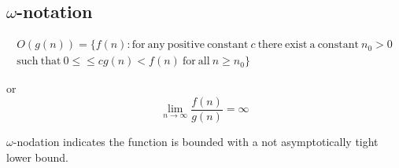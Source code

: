 \subsection{$\omega$-notation}


\begin{gather*}
  O(g(n)) = \{ f(n): \mathrm{for\ any\ positive\ constant\ } c\ \mathrm{there\ exist\ a\ constant\ } n_0 > 0 \\
  \mathrm{such\ that\ } 0 \le \le c g(n) < f(n) \mathrm{\ for\ all\ } n\ge n_0 \}
\end{gather*}

or
\begin{equation*}
  \lim_{n\rightarrow\infty}\frac{f(n)}{g(n)} = \infty
\end{equation*}

$\omega$-nodation indicates the function is bounded with a not asymptotically tight lower bound.
